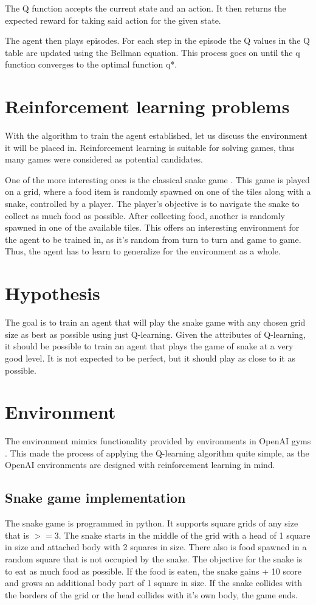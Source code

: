 \documentclass[lettersize,journal]{IEEEtran}
\begin{document}
The Q function accepts the current state and an action. It then
returns the expected reward for taking said action for the given
state.

The agent then plays episodes. For each step in the episode
the Q values in the Q table are updated using the Bellman
equation. This process goes on until the q function converges
to the optimal function q*.


\section{Reinforcement learning problems}
With the algorithm to train the agent established, let us
discuss the environment it will be placed in.
Reinforcement learning is suitable for solving games, thus
many games were considered as potential candidates.

One of the more interesting ones is the classical snake game \cite{snake}.
This game is played on a grid, where a food item is randomly
spawned on one of the tiles along with a snake, controlled
by a player. The player's objective is to navigate the snake to collect
as much food as possible. After collecting food, another is randomly spawned
in one of the available tiles. This offers an interesting environment
for the agent to be trained in, as it's random from turn to turn and game
to game. Thus, the agent has to learn to generalize for the environment as a whole.


\section{Hypothesis}\label{hyp}
The goal is to train an agent that will play the snake game
with any chosen grid size as best as possible using just Q-learning.
Given the attributes of Q-learning, it should be possible to train
an agent that plays the game of snake at a very good level. It
is not expected to be perfect, but it should play as close to it
as possible.

\section{Environment}
The environment mimics functionality provided by environments in
OpenAI gyms \cite{openai}. This made the process of applying the Q-learning
algorithm quite simple, as the OpenAI environments are designed
with reinforcement learning in mind.

\subsection{Snake game implementation}
The snake game is programmed in python.
It supports square grids of any size that is $>= 3$.
The snake starts in the middle of the grid with a head of
1 square in size and attached
body with 2 squares in size. There also is food spawned in a random
square that is not occupied by the snake. The objective for the
snake is to eat as much food as possible. If the food is eaten,
the snake gains + 10 score and grows an additional body part of
1 square in size. If the snake collides with the borders of the grid
or the head collides with it's own body, the game ends.\label{game-over}
\end{document}
